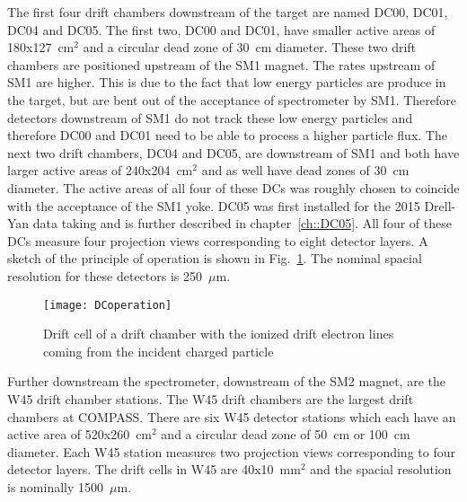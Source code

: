 The first four drift chambers downstream of the target are named DC00, DC01,
DC04 and DC05.  The first two, DC00 and DC01, have smaller active areas of
180x127~cm$^2$ and a circular dead zone of 30~cm diameter.  These two drift
chambers are positioned upstream of the SM1 magnet.  The rates upstream of SM1
are higher.  This is due to the fact that low energy particles are produce in
the target, but are bent out of the acceptance of spectrometer by SM1.
Therefore detectors downstream of SM1 do not track these low energy particles
and therefore DC00 and DC01 need to be able to process a higher particle flux.
The next two drift chambers, DC04 and DC05, are downstream of SM1 and both have
larger active areas of 240x204~cm$^2$ and as well have dead zones of 30~cm
diameter.  The active areas of all four of these DCs was roughly chosen to
coincide with the acceptance of the SM1 yoke.  DC05 was first installed for the
2015 Drell-Yan data taking and is further described in chapter~\ref{ch::DC05}.
All four of these DCs measure four projection views corresponding to eight
detector layers.  A sketch of the principle of operation is shown in
Fig.~\ref{fig::DCoperation}.  The nominal spacial resolution for these detectors
is 250~$\mu$m. \par

\begin{figure}[h!t]
  \centering
  \texttt{[image: DCoperation]}
  \caption{Drift cell of a drift chamber with the ionized drift electron lines
    coming from the incident charged particle}
  \label{fig::DCoperation}
\end{figure}

Further downstream the spectrometer, downstream of the SM2 magnet, are the W45
drift chamber stations.  The W45 drift chambers are the largest drift chambers
at COMPASS.  There are six W45 detector stations which each have an active area
of 520x260~cm$^2$ and a circular dead zone of 50~cm or 100~cm diameter.  Each
W45 station measures two projection views corresponding to four detector layers.
The drift cells in W45 are 40x10~mm$^2$ and the spacial resolution is nominally
1500~$\mu$m. \par

